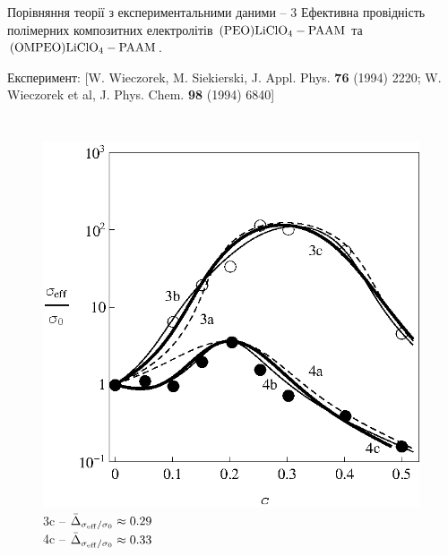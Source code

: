 \documentclass[10pt]{beamer}
\begin{document}
\begin{frame}{Порівняння теорії з експериментальними даними -- 3}
Ефективна провідність полімерних композитних електролітів $\rm (PEO)LiClO_4-PAAM$ та $\rm (OMPEO)LiClO_4-PAAM$.
\vspace{-5pt}

\scriptsize{Експеримент: [W. Wieczorek, M. Siekierski, J. Appl. Phys. {\bf 76} (1994) 2220; W. Wieczorek et al, J. Phys. Chem. {\bf 98} (1994) 6840]}
\vspace{-5pt}

\footnotesize
\begin{columns}[T,onlytextwidth]
      \begin{figure}
        \centering
        \includegraphics[width=0.99\textwidth]{images/Fig3_PEO-PAAM_LiClO4_OMPEO-PAAM_LiClO4.eps}
        3c -- $\bar{\Delta}_{\sigma_{\rm eff}/\sigma_0} \approx 0.29$\\
        4c -- $\bar{\Delta}_{\sigma_{\rm eff}/\sigma_0} \approx 0.33$
      \end{figure}


\end{columns}
\end{frame}
\end{document}
